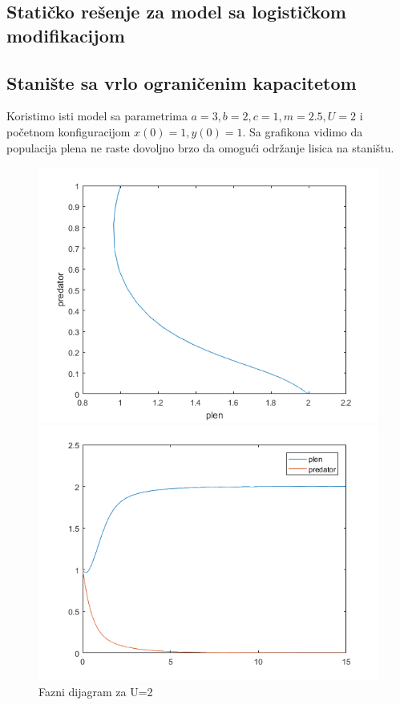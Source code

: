 \documentclass[a4paper]{article}
\begin{document}
\subsection{Statičko rešenje za model sa logističkom modifikacijom}

\subsection{Stanište sa vrlo ograničenim kapacitetom}
\label{sub:log_mod_ogr}

Koristimo isti model sa parametrima $a=3, b=2, c=1, m=2.5, U=2$
i početnom konfiguracijom $x(0)=1, y(0)=1$.
Sa grafikona vidimo da populacija plena ne raste dovoljno brzo da omogući
održanje lisica na staništu.

\begin{figure}[H]
    \centering
    \begin{minipage}{0.45\textwidth}
        \centering
        \includegraphics[width=1\textwidth]{images/lv_low_u_phase} %
        \caption{Fazni dijagram za U=2}
    \end{minipage}\hfill
    \begin{minipage}{0.45\textwidth}
        \centering
        \includegraphics[width=1\textwidth]{images/lv_low_u_time} %

\end{minipage}
\end{figure}
\end{document}
